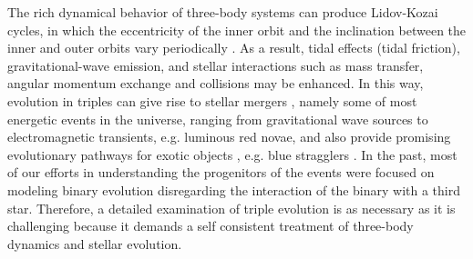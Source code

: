 The rich dynamical behavior of three-body systems can produce Lidov-Kozai cycles, in which the eccentricity of the inner orbit and the inclination between the inner and outer orbits vary periodically \citep{michaely2014secular,toonen2016evolution,mangipudi2022extreme}. As a result, tidal effects (tidal friction), gravitational-wave emission, and stellar interactions such as mass transfer, angular momentum exchange and collisions may be enhanced. In this way, evolution in triples can give rise to stellar mergers \citep{antonini2017binary,silsbee2017lidov,vigna2021massive}, namely some of most energetic events in the universe, ranging from gravitational wave sources to electromagnetic transients, e.g. luminous red novae, and also provide promising evolutionary pathways for exotic objects \citep{sana2012binary, toonen2016evolution}, e.g. blue stragglers \citep{winn2009spin}. In the past, most of our efforts in understanding the progenitors of the events were focused on modeling binary evolution disregarding the interaction of the binary with a third star. Therefore, a detailed examination of triple evolution is as necessary as it is challenging because it demands a self consistent treatment of three-body dynamics and stellar evolution.








